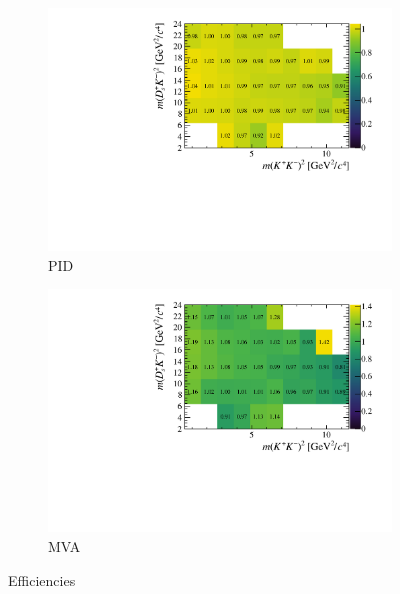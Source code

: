 \begin{figure}[!h]
   \centering
   \begin{subfigure}[t]{0.4\textwidth}
      \includegraphics[width=1.0\textwidth]{figs/B2DsKK/Relative_Eff_PID_All.pdf}
      \caption{PID}
      \label{fig:B2DsKK_releff_PID}
   \end{subfigure}
   \begin{subfigure}[t]{0.4\textwidth}
      \includegraphics[width=1.0\textwidth]{figs/B2DsKK/Relative_Eff_BDT_All.pdf}
      \caption{MVA}
      \label{fig:B2DsKK_releff_MVA}
   \end{subfigure}
   \caption{Efficiencies}
   \label{fig:B2DsKK_dalitz_eff_three}
\end{figure}



